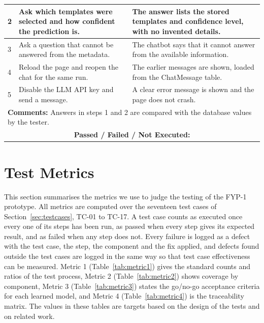 \documentclass{FastFyp}
\begin{document}
{\begin{longtable}{|p{2.4cm}|p{4.6cm}|p{2.4cm}|p{3.8cm}|}
2 & Ask which templates were selected and how confident the prediction is. & \multicolumn{2}{p{6.64cm}|}{The answer lists the stored templates and confidence level, with no invented details.} \\ \hline
3 & Ask a question that cannot be answered from the metadata. & \multicolumn{2}{p{6.64cm}|}{The chatbot says that it cannot answer from the available information.} \\ \hline
4 & Reload the page and reopen the chat for the same run. & \multicolumn{2}{p{6.64cm}|}{The earlier messages are shown, loaded from the ChatMessage table.} \\ \hline
5 & Disable the LLM API key and send a message. & \multicolumn{2}{p{6.64cm}|}{A clear error message is shown and the page does not crash.} \\ \hline
\multicolumn{4}{|p{14.51cm}|}{\textbf{Comments:} Answers in steps 1 and 2 are compared with the database values by the tester.} \\ \hline
\multicolumn{4}{|c|}{\textbf{Passed / Failed / Not Executed:}} \\ \hline
\end{longtable}
}

\section{Test Metrics}
\label{sec:testmetrics}
This section summarises the metrics we use to judge the testing of the FYP-1 prototype. All metrics are computed over the seventeen test cases of Section~\ref{sec:testcases}, TC-01 to TC-17. A test case counts as executed once every one of its steps has been run, as passed when every step gives its expected result, and as failed when any step does not. Every failure is logged as a defect with the test case, the step, the component and the fix applied, and defects found outside the test cases are logged in the same way so that test case effectiveness can be measured. Metric 1 (Table~\ref{tab:metric1}) gives the standard counts and ratios of the test process, Metric 2 (Table~\ref{tab:metric2}) shows coverage by component, Metric 3 (Table~\ref{tab:metric3}) states the go/no-go acceptance criteria for each learned model, and Metric 4 (Table~\ref{tab:metric4}) is the traceability matrix. The values in these tables are targets based on the design of the tests and on related work.
\end{document}

